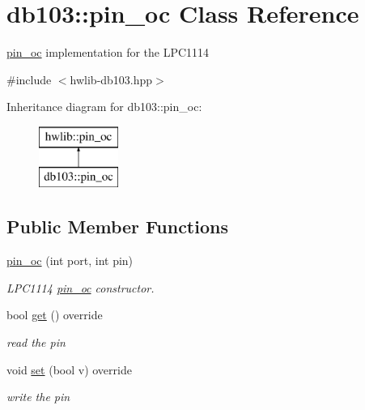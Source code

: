 \hypertarget{classdb103_1_1pin__oc}{}\section{db103\+:\+:pin\+\_\+oc Class Reference}
\label{classdb103_1_1pin__oc}


\hyperlink{classdb103_1_1pin__oc}{pin\+\_\+oc} implementation for the L\+P\+C1114  




{\ttfamily \#include $<$hwlib-\/db103.\+hpp$>$}

Inheritance diagram for db103\+:\+:pin\+\_\+oc\+:\begin{figure}[H]
\begin{center}
\leavevmode
\includegraphics[height=2.000000cm]{classdb103_1_1pin__oc}
\end{center}
\end{figure}
\subsection*{Public Member Functions}
\begin{DoxyCompactItemize}
\item 
\hyperlink{classdb103_1_1pin__oc_aaae7efd6d4586a1207fb05666f4d04d1}{pin\+\_\+oc} (int port, int pin)
\begin{DoxyCompactList}\small\item\em L\+P\+C1114 \hyperlink{classdb103_1_1pin__oc}{pin\+\_\+oc} constructor. \end{DoxyCompactList}\item 
bool \hyperlink{classdb103_1_1pin__oc_aae586f82351ac94fc52f7fabcb5883d8}{get} () override
\begin{DoxyCompactList}\small\item\em read the pin \end{DoxyCompactList}\item 
void \hyperlink{classdb103_1_1pin__oc_afce9e329b087308a33ae30dbd701b08a}{set} (bool v) override
\begin{DoxyCompactList}\small\item\em write the pin \end{DoxyCompactList}\end{DoxyCompactItemize}


